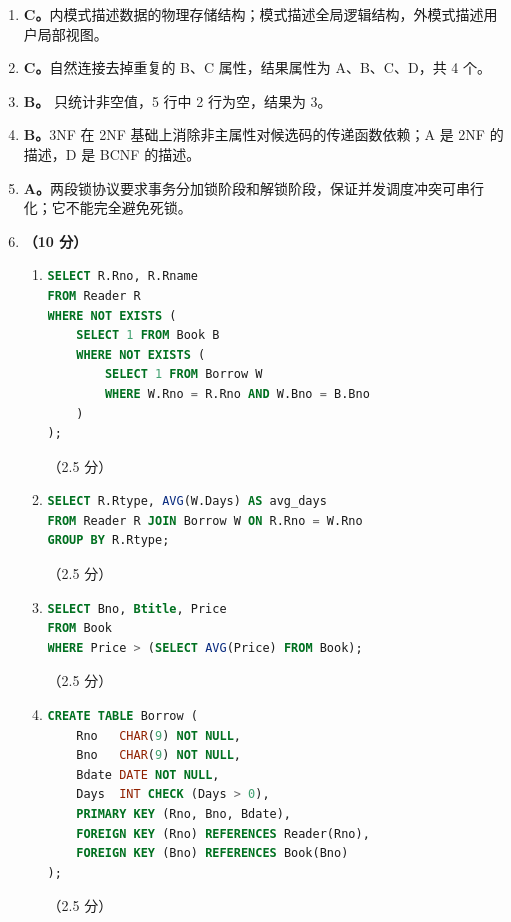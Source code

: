 \documentclass[a4paper,11pt]{article}
\begin{document}
\begin{enumerate}[start=21, label=\textbf{\arabic*.}, leftmargin=2.4em, itemsep=0.45em]

\item \textbf{C。}内模式描述数据的物理存储结构；模式描述全局逻辑结构，外模式描述用户局部视图。

\item \textbf{C。}自然连接去掉重复的 B、C 属性，结果属性为 A、B、C、D，共 4 个。

\item \textbf{B。} 只统计非空值，5 行中 2 行为空，结果为 3。

\item \textbf{B。}3NF 在 2NF 基础上消除非主属性对候选码的传递函数依赖；A 是 2NF 的描述，D 是 BCNF 的描述。

\item \textbf{A。}两段锁协议要求事务分加锁阶段和解锁阶段，保证并发调度冲突可串行化；它不能完全避免死锁。

\item \textbf{（10 分）}
\begin{enumerate}[label=（\arabic*）, leftmargin=2.2em, itemsep=2pt]
  \item
\begin{lstlisting}[language=SQL]
SELECT R.Rno, R.Rname
FROM Reader R
WHERE NOT EXISTS (
    SELECT 1 FROM Book B
    WHERE NOT EXISTS (
        SELECT 1 FROM Borrow W
        WHERE W.Rno = R.Rno AND W.Bno = B.Bno
    )
);
\end{lstlisting}
\hfill（2.5 分）
  \item
\begin{lstlisting}[language=SQL]
SELECT R.Rtype, AVG(W.Days) AS avg_days
FROM Reader R JOIN Borrow W ON R.Rno = W.Rno
GROUP BY R.Rtype;
\end{lstlisting}
\hfill（2.5 分）
  \item
\begin{lstlisting}[language=SQL]
SELECT Bno, Btitle, Price
FROM Book
WHERE Price > (SELECT AVG(Price) FROM Book);
\end{lstlisting}
\hfill（2.5 分）
  \item
\begin{lstlisting}[language=SQL]
CREATE TABLE Borrow (
    Rno   CHAR(9) NOT NULL,
    Bno   CHAR(9) NOT NULL,
    Bdate DATE NOT NULL,
    Days  INT CHECK (Days > 0),
    PRIMARY KEY (Rno, Bno, Bdate),
    FOREIGN KEY (Rno) REFERENCES Reader(Rno),
    FOREIGN KEY (Bno) REFERENCES Book(Bno)
);
\end{lstlisting}
\hfill（2.5 分）
\end{enumerate}


\end{enumerate}
\end{document}
